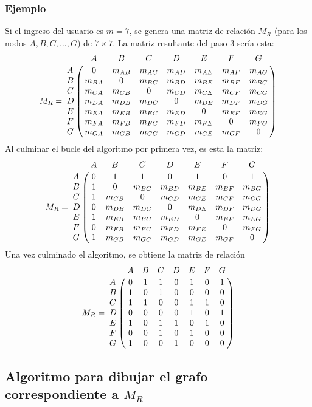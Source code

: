 \documentclass[12pt]{article}
\begin{document}
\subsubsection*{Ejemplo}
Si el ingreso del usuario es $m=7$, se genera una matriz de relaci\'{o}n $M_{R}$ (para los nodos $A, B, C, ..., G$) de $7\times 7$. La matriz resultante del paso 3 ser\'{i}a esta:
$$M_{R}=
\bordermatrix{
     &     A     &     B          &     C          &     D          &     E          &     F          &     G          \cr
A    &     0     &     m_{AB}     &     m_{AC}     &     m_{AD}     &     m_{AE}     &     m_{AF}     &     m_{AG}     \cr
B    &     m_{BA}&     0          &     m_{BC}     &     m_{BD}     &     m_{BE}     &     m_{BF}     &     m_{BG}     \cr
C    &     m_{CA}&     m_{CB}     &     0          &     m_{CD}     &     m_{CE}     &     m_{CF}     &     m_{CG}     \cr
D    &     m_{DA}&     m_{DB}     &     m_{DC}     &     0          &     m_{DE}     &     m_{DF}     &     m_{DG}     \cr
E    &     m_{EA}&     m_{EB}     &     m_{EC}     &     m_{ED}     &     0          &     m_{EF}     &     m_{EG}     \cr
F    &     m_{FA}&     m_{FB}     &     m_{FC}     &     m_{FD}     &     m_{FE}     &     0          &     m_{FG}     \cr
G    &     m_{GA}&     m_{GB}     &     m_{GC}     &     m_{GD}     &     m_{GE}     &     m_{GF}     &     0     \cr
}
$$
Al culminar el bucle del algoritmo por primera vez, es esta la matriz:
$$M_{R}=
\bordermatrix{
     &     A     &     B          &     C          &     D          &     E          &     F          &     G          \cr
A    &     0     &     1          &     1          &     0          &     1          &     0          &     1          \cr
B    &     1     &     0          &     m_{BC}     &     m_{BD}     &     m_{BE}     &     m_{BF}     &     m_{BG}     \cr
C    &     1     &     m_{CB}     &     0          &     m_{CD}     &     m_{CE}     &     m_{CF}     &     m_{CG}     \cr
D    &     0     &     m_{DB}     &     m_{DC}     &     0          &     m_{DE}     &     m_{DF}     &     m_{DG}     \cr
E    &     1     &     m_{EB}     &     m_{EC}     &     m_{ED}     &     0          &     m_{EF}     &     m_{EG}     \cr
F    &     0     &     m_{FB}     &     m_{FC}     &     m_{FD}     &     m_{FE}     &     0          &     m_{FG}     \cr
G    &     1     &     m_{GB}     &     m_{GC}     &     m_{GD}     &     m_{GE}     &     m_{GF}     &     0     \cr
}
$$
Una vez culminado el algoritmo, se obtiene la matriz de relaci\'{o}n
$$M_{R}=
\bordermatrix{
 &A&B&C&D&E&F&G\cr
A&0&1&1&0&1&0&1\cr
B&1&0&1&0&0&0&0\cr
C&1&1&0&0&1&1&0\cr
D&0&0&0&0&1&0&1\cr
E&1&0&1&1&0&1&0\cr
F&0&0&1&0&1&0&0\cr
G&1&0&0&1&0&0&0\cr
}
$$
\subsection{Algoritmo para dibujar el grafo correspondiente a $M_{R}$}
\end{document}
